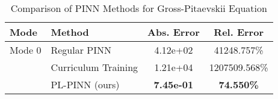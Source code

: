 \begin{table}[htbp]
\centering
\caption{Comparison of PINN Methods for Gross-Pitaevskii Equation}
\label{tab:pinn_comparison}
\begin{tabular}{llcc}
\toprule
Mode & Method & Abs. Error & Rel. Error \\
\midrule
Mode 0 & Regular PINN & 4.12e+02 & 41248.757\% \\
 & Curriculum Training & 1.21e+04 & 1207509.568\% \\
 & PL-PINN (ours) & \textbf{7.45e-01} & \textbf{74.550\%} \\
\bottomrule
\end{tabular}
\end{table}